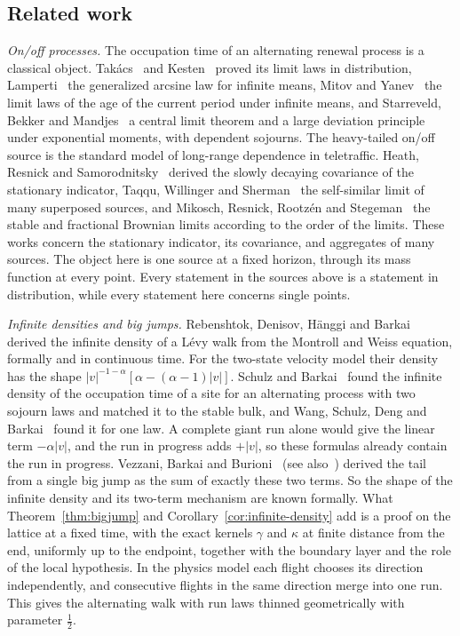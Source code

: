 \subsection{Related work}\label{sec:intro-related}

\emph{On/off processes.} The occupation time of an alternating renewal process is a
classical object. Tak\'acs~\cite{takacs1957,takacs1959} and Kesten~\cite{kesten1962} proved
its limit laws in distribution, Lamperti~\cite{lamperti1958} the generalized arcsine law for
infinite means, Mitov and Yanev~\cite{mitovyanev2001} the limit laws of the age of the current
period under infinite means, and
Starreveld, Bekker and Mandjes~\cite{sbm2018} a central limit theorem and a large deviation
principle under exponential moments, with dependent sojourns. The heavy-tailed on/off source
is the standard model of long-range dependence in teletraffic. Heath, Resnick and
Samorodnitsky~\cite{hrs1998} derived the slowly decaying covariance of the stationary
indicator, Taqqu, Willinger and Sherman~\cite{tws1997} the self-similar limit of many
superposed sources, and Mikosch, Resnick, Rootz\'en and Stegeman~\cite{mrrs2002} the stable
and fractional Brownian limits according to the order of the limits. These works concern the
stationary indicator, its covariance, and aggregates of many sources. The object here is one
source at a fixed horizon, through its mass function at every point. Every statement in the
sources above is a statement in distribution, while every statement here concerns single
points.

\emph{Infinite densities and big jumps.} Rebenshtok, Denisov, H\"anggi and
Barkai~\cite{rdhb2014,rdhb2014b} derived the infinite density of a L\'evy walk from the
Montroll and Weiss equation, formally and in continuous time. For the two-state velocity
model their density~\cite[Eqs.~(8) and~(10)]{rdhb2014} has the shape
$|v|^{-1-\alpha}[\alpha-(\alpha-1)|v|]$. Schulz and Barkai~\cite[Eqs.~(25) and~(26)]{sb2015}
found the infinite density of the occupation time of a site for an alternating process with
two sojourn laws and matched it to the stable bulk, and Wang, Schulz, Deng and
Barkai~\cite[Eq.~(83)]{wsdb2018} found it for one law. A complete giant run alone would give
the linear term $-\alpha|v|$, and the run in progress adds $+|v|$, so these formulas already
contain the run in progress. Vezzani, Barkai and Burioni~\cite[Eqs.~(12) and~(13)]{vbb2019}
(see also~\cite{vbb2020}) derived the tail from a single big jump as the sum of exactly these
two terms. So the shape of the infinite density and its two-term mechanism are known
formally. What Theorem~\ref{thm:bigjump} and Corollary~\ref{cor:infinite-density} add is a
proof on the lattice at a fixed time, with the exact kernels $\gamma$ and $\kappa$ at finite
distance from the end, uniformly up to the endpoint, together with the boundary layer and the
role of the local hypothesis. In the physics model each flight chooses its direction
independently, and consecutive flights in the same direction merge into one run. This gives
the alternating walk with run laws thinned geometrically with parameter $\frac12$.

